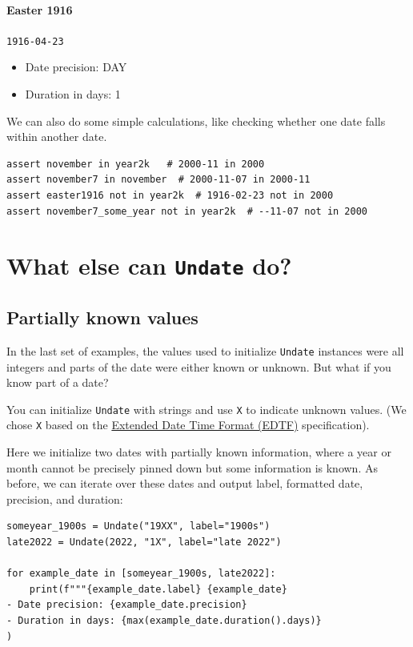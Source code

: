 \documentclass{anthology-ch}         %
\begin{document}
\paragraph{Easter 1916} \texttt{1916-04-23}
\begin{itemize}
    \item Date precision: DAY
    \item Duration in days: 1
\end{itemize}

We can also do some simple calculations, like checking whether one date falls within another date.
\begin{verbatim}
assert november in year2k   # 2000-11 in 2000
assert november7 in november  # 2000-11-07 in 2000-11
assert easter1916 not in year2k  # 1916-02-23 not in 2000
assert november7_some_year not in year2k  # --11-07 not in 2000
\end{verbatim}

\section{What else can \texttt{Undate} do?}

\subsection{Partially known values}

In the last set of examples, the values used to initialize \texttt{Undate} instances were all integers and parts of the date were either known or unknown. But what if you know part of a
date?

You can initialize \texttt{Undate} with strings and use \texttt{X} to
indicate unknown values.  (We chose \texttt{X} based on the \href{https://www.loc.gov/standards/datetime/}{Extended Date Time Format (EDTF)} specification).

Here we initialize two dates with partially known information, where a year or month cannot be precisely pinned down but some information is known. As before, we can iterate over these dates
and output label, formatted date, precision, and duration:

\begin{verbatim}
someyear_1900s = Undate("19XX", label="1900s")
late2022 = Undate(2022, "1X", label="late 2022")

for example_date in [someyear_1900s, late2022]:
    print(f"""{example_date.label} {example_date}
- Date precision: {example_date.precision}
- Duration in days: {max(example_date.duration().days)}
)
\end{verbatim}
\end{document}
